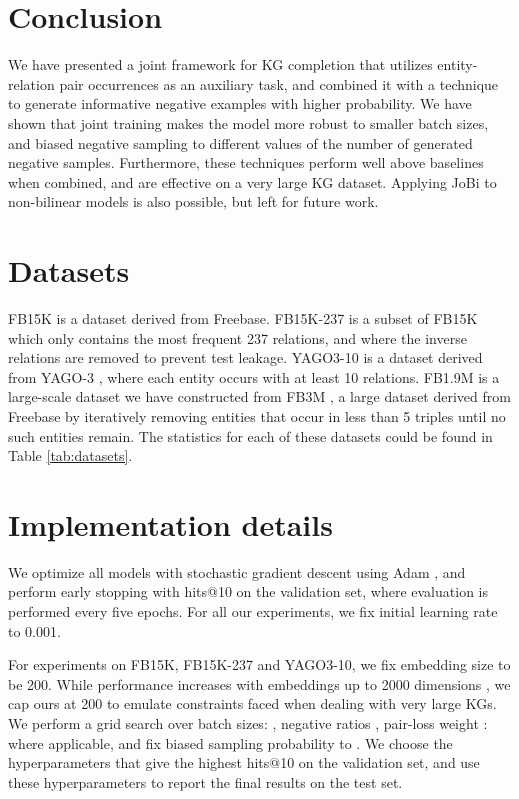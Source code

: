 \documentclass[11pt,a4paper, dvipsnames]{article}
\begin{document}
\section{Conclusion}

We have presented a joint framework for KG completion that utilizes entity-relation pair occurrences as an auxiliary task, and combined it with a technique to generate informative negative examples with higher probability. We have shown that joint training makes the model more robust to smaller batch sizes, and biased negative sampling to different values of the number of generated negative samples. Furthermore, these techniques perform well above baselines when combined, and are effective on a very large KG dataset. Applying JoBi to non-bilinear models is also possible, but left for future work.



\newpage

\appendix


\section{Datasets} \label{sec:Datasets}
 FB15K \citep{Bordes2013TranslatingData} is a dataset derived from Freebase. FB15K-237 \citep{Toutanova2015RepresentingBases} is a subset of FB15K which only contains the most frequent 237 relations, and where the inverse relations are removed to prevent test leakage.  YAGO3-10 \citep{Dettmers2018ConvolutionalEmbeddings} is a dataset derived from YAGO-3 \citep{Suchanek2007Yago}, where each entity occurs with at least 10 relations. FB1.9M is a large-scale dataset we have constructed from FB3M \citep{Xu2018InvestigationsExtraction}, a large dataset derived from Freebase by iteratively removing entities that occur in less than 5
triples until no such entities remain. The statistics for each of these datasets could be found in Table \ref{tab:datasets}.

\section{Implementation details}\label{sec:implementation}
We optimize all models with stochastic gradient descent using Adam \citep{Kingma2014Adam:Optimization}, and perform early stopping with hits@10 on the validation set, where evaluation is performed every five epochs. For all our experiments, we fix initial learning rate to 0.001.

For experiments on FB15K, FB15K-237 and YAGO3-10, we fix embedding size to be 200. While performance increases with embeddings up to 2000 dimensions \cite{Kadlec2017KnowledgeBack, Lacroix2018CanonicalCompletion}, we cap ours at 200 to emulate constraints faced when dealing with very large KGs.  We perform a grid search over batch sizes: , negative ratios , pair-loss weight  :   where applicable, and fix biased sampling probability  to . We choose the hyperparameters that give the highest hits@10 on the validation set, and use these hyperparameters to report the final results on the test set. 
\end{document}
